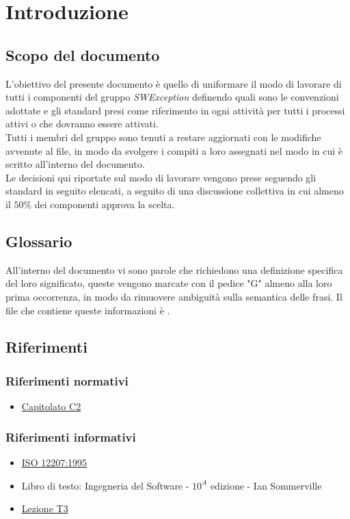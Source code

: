 \section{Introduzione}
\subsection{Scopo del documento}
L'obiettivo del presente documento è quello di uniformare il modo di lavorare di tutti i
componenti del gruppo \textit{SWException} definendo quali sono le convenzioni adottate e gli
standard presi come riferimento in ogni attività per tutti i processi attivi o che dovranno essere
attivati.\\
Tutti i membri del gruppo sono tenuti a restare aggiornati con le modifiche avvenute al file,
in modo da svolgere i compiti a loro assegnati nel modo in cui è scritto all'interno del documento.\\
Le decisioni qui riportate sul modo di lavorare vengono prese seguendo gli standard in seguito elencati,
a seguito di una discussione collettiva in cui almeno il $50\%$ dei componenti approva la scelta.

\subsection{Glossario}
All'interno del documento vi sono parole che richiedono una definizione specifica del loro significato,
queste vengono marcate con il pedice "G" almeno alla loro prima occorrenza, in modo da rimuovere ambiguità
sulla semantica delle frasi. Il file che contiene queste informazioni è .

\subsection{Riferimenti}
\subsubsection{Riferimenti normativi}
\begin{itemize}
    \item \href{https://www.math.unipd.it/~tullio/IS-1/2020/Progetto/C2.pdf}{Capitolato C2}
\end{itemize}

\subsubsection{Riferimenti informativi}
\begin{itemize}
    \item \href{https://www.math.unipd.it/~tullio/IS-1/2009/Approfondimenti/ISO_12207-1995.pdf}{ISO 12207:1995}
    \item Libro di testo: Ingegneria del Software - $10^A$ edizione - Ian Sommerville
    \item \href{https://www.math.unipd.it/~tullio/IS-1/2020/Dispense/L03.pdf}{Lezione T3}
\end{itemize}